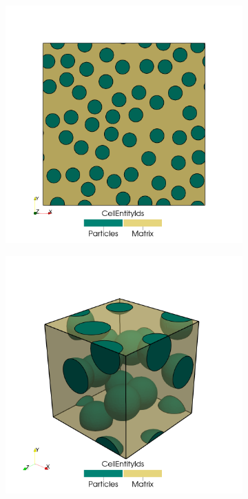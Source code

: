 \begin{figure}[hbt]
  \centering
	\begin{subfigure}[b]{0.45\textwidth}
    \centering
    \includegraphics[width=\textwidth]{figures/2d_microstructure}
    \caption{}
    \label{subfig:2d_microstructure}
  \end{subfigure} \hfill
  \begin{subfigure}[b]{0.45\textwidth}
    \centering
    \includegraphics[width=\textwidth]{figures/3d_microstructure}

\end{subfigure}
\end{figure}

